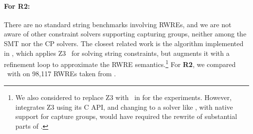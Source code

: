 \paragraph{For \textbf{R2}:} There are no standard string benchmarks
involving RWREs, and we are not aware of other constraint solvers
supporting capturing groups, neither among the SMT nor the CP
solvers. %
The closest related work is the algorithm implemented in \expose{}, which
applies Z3~\cite{Z3} for solving string constraints, but augments
it with a refinement loop to approximate the RWRE
semantics.\footnote{We also considered to replace Z3 with \ostrich\ in
  \expose{} for the experiments. However, \expose{} integrates Z3 using its
  C API, and changing to a solver like \ostrich, with native support
  for capture groups, would have required the rewrite of substantial
  parts of \expose{}.}
%
For \textbf{R2}, we compared \ostrich\ with \expose{} on 98,117
RWREs taken from \cite{DMC+19}.

